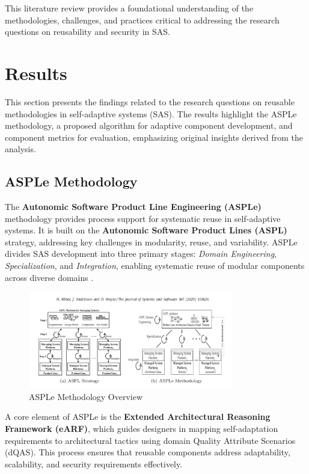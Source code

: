 \documentclass[a4paper,10pt]{article}
\begin{document}
This literature review provides a foundational understanding of the methodologies, challenges, and practices critical to addressing the research questions on reusability and security in SAS.


\section{Results}

This section presents the findings related to the research questions on reusable methodologies in self-adaptive systems (SAS). The results highlight the ASPLe methodology, a proposed algorithm for adaptive component development, and component metrics for evaluation, emphasizing original insights derived from the analysis.

\subsection{ASPLe Methodology}

The \textbf{Autonomic Software Product Line Engineering (ASPLe)} methodology provides process support for systematic reuse in self-adaptive systems. It is built on the \textbf{Autonomic Software Product Lines (ASPL)} strategy, addressing key challenges in modularity, reuse, and variability. ASPLe divides SAS development into three primary stages: \textit{Domain Engineering}, \textit{Specialization}, and \textit{Integration}, enabling systematic reuse of modular components across diverse domains \cite{Nadeem2020}.

\begin{figure}[ht]
\centering
\includegraphics[width=0.8\textwidth]{asple_diagram.png}
\caption{ASPLe Methodology Overview}
\label{fig:asple}
\end{figure}

A core element of ASPLe is the \textbf{Extended Architectural Reasoning Framework (eARF)}, which guides designers in mapping self-adaptation requirements to architectural tactics using domain Quality Attribute Scenarios (dQAS). This process ensures that reusable components address adaptability, scalability, and security requirements effectively. 
\end{document}
